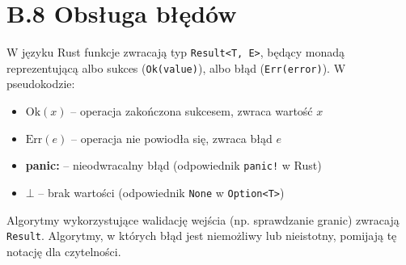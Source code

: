 \section*{B.8 Obsługa błędów}

W języku Rust funkcje zwracają typ \texttt{Result<T, E>}, będący monadą reprezentującą albo sukces (\texttt{Ok(value)}), albo błąd (\texttt{Err(error)}). W pseudokodzie:

\begin{itemize}
	\item $\text{Ok}(x)$ -- operacja zakończona sukcesem, zwraca wartość $x$
	\item $\text{Err}(e)$ -- operacja nie powiodła się, zwraca błąd $e$
	\item \textbf{panic:} -- nieodwracalny błąd (odpowiednik \texttt{panic!} w Rust)
	\item $\bot$ -- brak wartości (odpowiednik \texttt{None} w \texttt{Option<T>})
\end{itemize}

Algorytmy wykorzystujące walidację wejścia (np. sprawdzanie granic) zwracają \texttt{Result}. Algorytmy, w których błąd jest niemożliwy lub nieistotny, pomijają tę notację dla czytelności.
